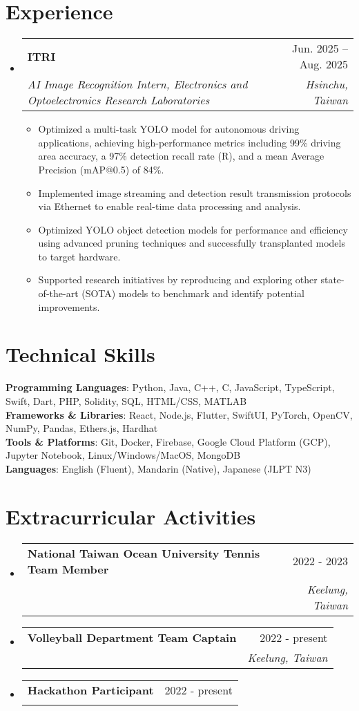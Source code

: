 \documentclass[letterpaper,11pt]{article}
\makeatletter
\newcommand{\resumeItem}[1]{
  \item\small{
    {#1 \vspace{-2pt}}
  }
}
\newcommand{\resumeSubheading}[4]{
  \vspace{-2pt}\item
    \begin{tabular*}{0.97\textwidth}[t]{l@{\extracolsep{\fill}}r}
      \textbf{#1} & #2 \\
      \textit{\small#3} & \textit{\small #4} \\
    \end{tabular*}\vspace{-7pt}
}
\newcommand{\resumeSubHeadingListStart}{\begin{itemize}[leftmargin=0.15in, label={}]}
\newcommand{\resumeSubHeadingListEnd}{\end{itemize}}
\newcommand{\resumeItemListStart}{\begin{itemize}}
\newcommand{\resumeItemListEnd}{\end{itemize}\vspace{-5pt}}
\makeatother
\begin{document}
\section{Experience}
    \resumeSubHeadingListStart
      \resumeSubheading
        {ITRI}{Jun. 2025 -- Aug. 2025}
        {\textit{AI Image Recognition Intern, Electronics and Optoelectronics Research Laboratories}}{Hsinchu, Taiwan}
        \resumeItemListStart
            \resumeItem{Optimized a multi-task YOLO model for autonomous driving applications, achieving high-performance metrics including 99\% driving area accuracy, a 97\% detection recall rate (R), and a mean Average Precision (mAP@0.5) of 84\%.}
            \resumeItem{Implemented image streaming and detection result transmission protocols via Ethernet to enable real-time data processing and analysis.}
            \resumeItem{Optimized YOLO object detection models for performance and efficiency using advanced pruning techniques and successfully transplanted models to target hardware.}
            \resumeItem{Supported research initiatives by reproducing and exploring other state-of-the-art (SOTA) models to benchmark and identify potential improvements.}
        \resumeItemListEnd
    \resumeSubHeadingListEnd

\section{Technical Skills}
 \begin{itemize}[leftmargin=0.15in, label={}]
    \small{\item{
     \textbf{Programming Languages}{: Python, Java, C++, C, JavaScript, TypeScript, Swift, Dart, PHP, Solidity, SQL, HTML/CSS, MATLAB} \\
     \textbf{Frameworks \& Libraries}{: React, Node.js, Flutter, SwiftUI, PyTorch, OpenCV, NumPy, Pandas, Ethers.js, Hardhat} \\
     \textbf{Tools \& Platforms}{: Git, Docker, Firebase, Google Cloud Platform (GCP), Jupyter Notebook, Linux/Windows/MacOS, MongoDB} \\
     \textbf{Languages}{: English (Fluent), Mandarin (Native), Japanese (JLPT N3)}
    }}
 \end{itemize}

\section{Extracurricular Activities}
    \resumeSubHeadingListStart
      \resumeSubheading
        {National Taiwan Ocean University Tennis Team Member}{2022 - 2023}{}{Keelung, Taiwan}
      \resumeSubheading
        {Volleyball Department Team Captain}{2022 - present}{}{Keelung, Taiwan}
      \resumeSubheading
        {Hackathon Participant}{2022 - present}{}{} 
    \resumeSubHeadingListEnd

\end{document}
